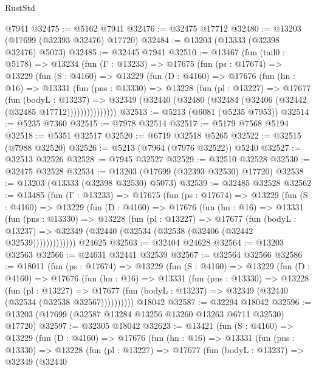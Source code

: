 \begin{lexlean}{RustStd}
\begin{coremodule}
    @7941
@32475 := @5162 @7941
@32476 := @32475 @17712
@32480 := @13203 (@17699 (@32393 @32476) @17720)
@32484 := @13203 (@13333 (@32398 @32476) @5073)
@32485 := @32445 @7941
@32510 := @13467
    (fun (tail0 : @5178) =>
    @13234
      (fun (Γ : @13233) =>
      @17675
        (fun (ps : @17674) =>
        @13229
          (fun (S : @4160) =>
          @13229
            (fun (D : @4160) =>
            @17676
              (fun (hn : @16) =>
              @13331
                (fun (pns : @13330) =>
                @13228
                  (fun (pl : @13227) =>
                  @17677
                    (fun (bodyL : @13237) =>
                    @32349 (@32440 (@32480 (@32484 (@32406 (@32442 (@32485 @17712)))))))))))))))
@32513 := @5213 (@6081 (@5235 @7953))
@32514 := @5235 @7360
@32515 := @7978 @32514
@32517 := @5179 @7568 @5194
@32518 := @5351 @32517
@32520 := @6719 @32518 @5265
@32522 := @32515 (@7988 @32520)
@32526 := @5213 (@7964 (@7976 @32522)) @5240
@32527 := @32513 @32526
@32528 := @7945 @32527
@32529 := @32510 @32528
@32530 := @32475 @32528
@32534 := @13203 (@17699 (@32393 @32530) @17720)
@32538 := @13203 (@13333 (@32398 @32530) @5073)
@32539 := @32485 @32528
@32562 := @13485
    (fun (Γ : @13233) =>
    @17675
      (fun (ps : @17674) =>
      @13229
        (fun (S : @4160) =>
        @13229
          (fun (D : @4160) =>
          @17676
            (fun (hn : @16) =>
            @13331
              (fun (pns : @13330) =>
              @13228
                (fun (pl : @13227) =>
                @17677
                  (fun (bodyL : @13237) =>
                  @32349 (@32440 (@32534 (@32538 (@32406 (@32442 @32539)))))))))))))
    @24625
@32563 := @32404 @24628
@32564 := @13203 @32563
@32566 := @24631 @32441 @32539
@32567 := @32564 @32566
@32586 := @18011
    (fun (ps : @17674) =>
    @13229
      (fun (S : @4160) =>
      @13229
        (fun (D : @4160) =>
        @17676
          (fun (hn : @16) =>
          @13331
            (fun (pns : @13330) =>
            @13228
              (fun (pl : @13227) =>
              @17677 (fun (bodyL : @13237) => @32349 (@32440 (@32534 (@32538 @32567))))))))))
    @18042
@32587 := @32294 @18042
@32596 := @13203 (@17699 (@32587 @13284 @13256 @13260 @13263 @6711 @32530) @17720)
@32597 := @32305 @18042
@32623 := @13421
    (fun (S : @4160) =>
    @13229
      (fun (D : @4160) =>
      @17676
        (fun (hn : @16) =>
        @13331
          (fun (pns : @13330) =>
          @13228
            (fun (pl : @13227) =>
            @17677
              (fun (bodyL : @13237) =>
              @32349
                (@32440

\end{coremodule}
\end{lexlean}
